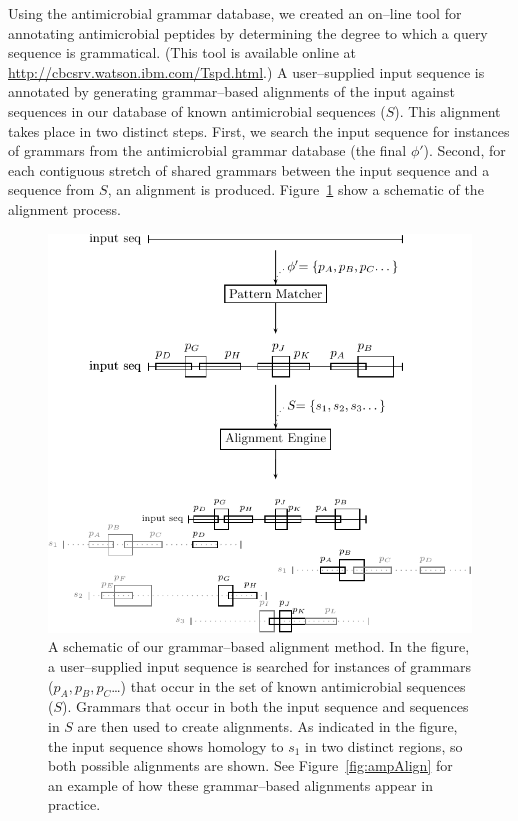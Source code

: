         Using the antimicrobial grammar database, we created an on--line tool
        for annotating antimicrobial peptides by determining the degree to which
        a query sequence is grammatical.  (This tool is
        available online at
        \url{http://cbcsrv.watson.ibm.com/Tspd.html}.)
        A user--supplied input sequence is annotated by generating grammar--based alignments
        of the input against sequences in our database of known antimicrobial
        sequences ($S$).  This alignment takes place
        in two distinct steps.  First, we search the input sequence for instances
        of grammars from the antimicrobial grammar database (the final $\phi'$).
        Second, for each contiguous stretch of shared grammars between the input
        sequence and a sequence from $S$, an alignment is produced.  Figure~\ref{fig:alignment}
        show a schematic of the alignment process.


        \begin{figure}[ptb]
        \centering
        \includegraphics{Body/Images-chap2/alignment.pdf}
        \caption[Schematic of the grammar--based alignment method]{
            A schematic of our grammar--based alignment method.  In the figure, a user--supplied
            input sequence is searched for instances of grammars ($p_A,p_B,p_C$\ldots) that occur
            in the set of known antimicrobial sequences ($S$).  Grammars that occur in both the
            input sequence and sequences in  $S$ are then used to create alignments.  As indicated in
            the figure, the input sequence shows homology to $s_1$ in two distinct regions, so
            both possible alignments are shown.  See
            Figure~\vref{fig:ampAlign} for an example of how these
            grammar--based alignments appear in practice.
        }
        \label{fig:alignment}
        \end{figure}

